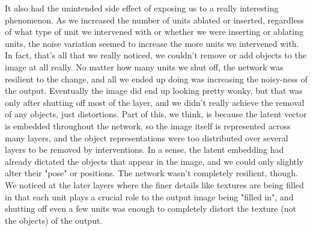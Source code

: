 \documentclass{article}
\begin{document}
It also had the unintended side effect of exposing us to a really interesting phenomenon. As we increased the number of units ablated or inserted, regardless of what type of unit we intervened with or whether we were inserting or ablating units, the noise variation seemed to increase the more units we intervened with. In fact, that's all that we really noticed, we couldn't remove or add objects to the image at all really. No matter how many units we shut off, the network was resilient to the change, and all we ended up doing was increasing the noisy-ness of the output. Eventually the image did end up looking pretty wonky, but that was only after shutting off most of the layer, and we didn't really achieve the removal of any objects, just distortions. Part of this, we think, is because the latent vector is embedded throughout the network, so the image itself is represented across many layers, and the object representations were too distributed over several layers to be removed by interventions. In a sense, the latent embedding had already dictated the objects that appear in the image, and we could only slightly alter their "pose" or positions. 
The network wasn't completely resilient, though. We noticed at the later layers where the finer details like textures are being filled in that each unit plays a crucial role to the output image being "filled in", and shutting off even a few units was enough to completely distort the texture (not the objects) of the output.
\end{document}

